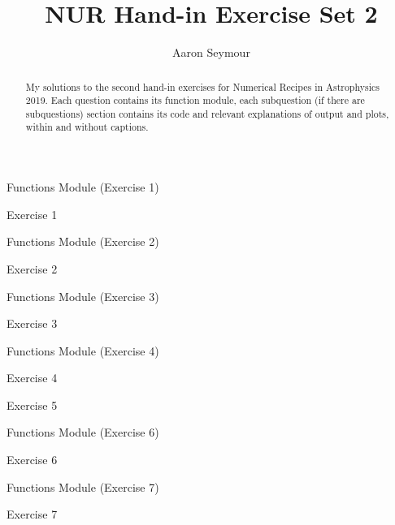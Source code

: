\documentclass[a4paper,10pt]{article}
\title{NUR Hand-in Exercise Set 2}
\author{Aaron Seymour}
\begin{document}
\maketitle

\begin{abstract}
 My solutions to the second hand-in exercises for Numerical Recipes in Astrophysics 2019. Each question contains its function module, each subquestion (if there are subquestions) section contains its code and relevant explanations of output and plots, within and without captions.
\end{abstract}


\begin{section}{Functions Module (Exercise 1)}

\end{section}

\begin{section}{Exercise 1}

\end{section}


\FloatBarrier
\begin{section}{Functions Module (Exercise 2)}

\end{section}

\begin{section}{Exercise 2}

\end{section}


\FloatBarrier
\begin{section}{Functions Module (Exercise 3)}

\end{section}

\begin{section}{Exercise 3}

\end{section}


\FloatBarrier
\begin{section}{Functions Module (Exercise 4)}

\end{section}

\begin{section}{Exercise 4}

\end{section}


\begin{section}{Exercise 5}

\end{section}


\FloatBarrier
\begin{section}{Functions Module (Exercise 6)}

\end{section}

\begin{section}{Exercise 6}

\end{section}


\FloatBarrier
\begin{section}{Functions Module (Exercise 7)}

\end{section}

\begin{section}{Exercise 7}

\end{section}
  
\end{document}
